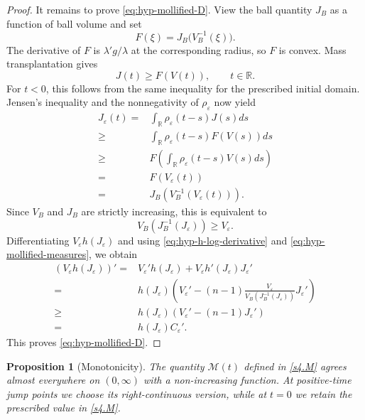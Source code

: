 \documentclass[11pt,reqno]{amsart}
\numberwithin{equation}{section}
\newtheorem{proposition}[theorem]{Proposition}
\theoremstyle{definition}
\begin{document}
\begin{proof}
It remains to prove \eqref{eq:hyp-mollified-D}. View the ball quantity $J_B$ as a function of ball volume and set
\begin{equation*}
    F(\xi)=J_B\bigl(V_B^{-1}(\xi)\bigr).
\end{equation*}
The derivative of $F$ is $\lambda'g/\lambda$ at the corresponding radius, so $F$ is convex. Mass transplantation gives
\begin{equation*}
    J(t)\geq F(V(t)),\qquad t\in\mathbb R.
\end{equation*}
For $t<0$, this follows from the same inequality for the prescribed
initial domain. Jensen's inequality and the nonnegativity of $\rho_\varepsilon$ now yield
\begin{align*}
    J_\varepsilon(t)=&\int_{\mathbb{R}}\rho_\varepsilon(t-s)J(s)ds\\
    \geq &\int_{\mathbb{R}}\rho_\varepsilon(t-s)F(V(s))ds\\
    \geq &F\left(\int_{\mathbb{R}}\rho_\varepsilon(t-s)V(s)ds\right)\\
    =&F(V_\varepsilon(t))\\
    =&J_B\left(V_B^{-1}(V_\varepsilon(t))\right). 
\end{align*}
Since $V_B$ and $J_B$ are strictly increasing, this is equivalent to
\begin{equation*}
    V_B\left(J_B^{-1}(J_\varepsilon)\right)\geq V_\varepsilon.
\end{equation*}
Differentiating $V_\varepsilon h(J_\varepsilon)$ and using \eqref{eq:hyp-h-log-derivative} and \eqref{eq:hyp-mollified-measures}, we obtain
\begin{align*}
    \left( V_\varepsilon h(J_\varepsilon) \right)'=&V_\varepsilon'h(J_\varepsilon)+V_\varepsilon h'(J_\varepsilon)J_\varepsilon'\\
    =&h(J_\varepsilon)
      \left(V_\varepsilon'-(n-1)
      \frac{V_\varepsilon}{V_B(J_B^{-1}(J_\varepsilon))}J_\varepsilon'\right)\\
    \geq& h(J_\varepsilon)
      \left(V_\varepsilon'-(n-1)J_\varepsilon'\right)\\
     =&h(J_\varepsilon)C_\varepsilon'.
\end{align*}
This proves \eqref{eq:hyp-mollified-D}.
\end{proof}

\begin{proposition}[Monotonicity]\label{prop:hyp-GLW-monotonicity}
The quantity $\mathcal M(t)$ defined in \eqref{s4.M} agrees almost everywhere on $(0,\infty)$ with a non-increasing function.  At positive-time jump points we choose its right-continuous version, while at $t=0$ we retain the prescribed value in \eqref{s4.M}.
\end{proposition}
\end{document}
